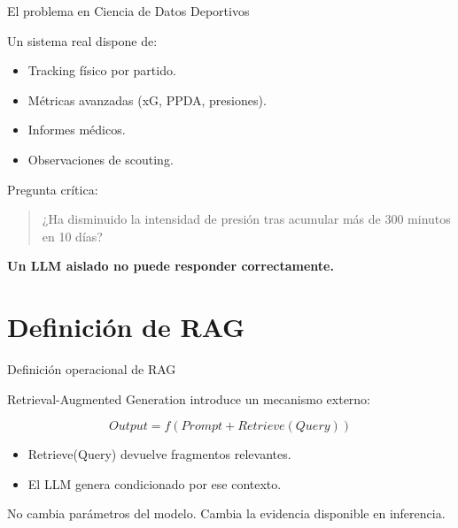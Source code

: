 \documentclass[aspectratio=169]{beamer}
\begin{document}

\begin{frame}{El problema en Ciencia de Datos Deportivos}

Un sistema real dispone de:

\begin{itemize}
    \item Tracking físico por partido.
    \item Métricas avanzadas (xG, PPDA, presiones).
    \item Informes médicos.
    \item Observaciones de scouting.
\end{itemize}

Pregunta crítica:

\begin{quote}
¿Ha disminuido la intensidad de presión tras acumular más de 300 minutos en 10 días?
\end{quote}

\textbf{Un LLM aislado no puede responder correctamente.}

\end{frame}

\section{Definición de RAG}
\frame{\sectionpage}

\begin{frame}{Definición operacional de RAG}

Retrieval-Augmented Generation introduce un mecanismo externo:

\[
Output = f(Prompt + Retrieve(Query))
\]

\begin{itemize}
    \item Retrieve(Query) devuelve fragmentos relevantes.
    \item El LLM genera condicionado por ese contexto.
\end{itemize}

\vspace{0.4em}

No cambia parámetros del modelo.  
Cambia la evidencia disponible en inferencia.

\end{frame}

\end{document}
